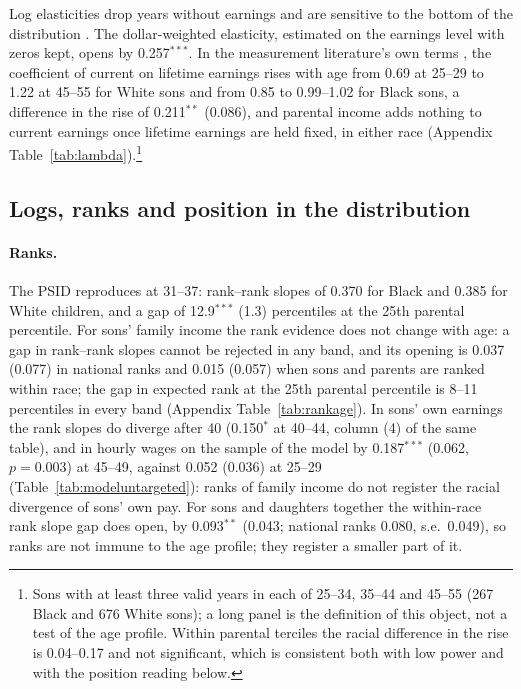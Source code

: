 Log elasticities drop years without earnings and are sensitive to the bottom of the distribution
\citep{mitnik2015new, mitnik2020intergenerational}. The dollar-weighted elasticity, estimated on the earnings level with
zeros kept, opens by 0.257$^{***}$. In the measurement literature's own terms \citep{haider2006life,
nybom2016heterogeneous}, the coefficient of current on lifetime earnings rises with age from 0.69 at 25--29 to 1.22 at
45--55 for White sons and from 0.85 to 0.99--1.02 for Black sons, a difference in the rise of 0.211$^{**}$ (0.086), and
parental income adds nothing to current earnings once lifetime earnings are held fixed, in either race (Appendix
Table~\ref{tab:lambda}).\footnote{Sons with at least three valid years in each of 25--34, 35--44 and 45--55 (267 Black
and 676 White sons); a long panel is the definition of this object, not a test of the age profile. Within parental
terciles the racial difference in the rise is 0.04--0.17 and not significant, which is consistent both with low power
and with the position reading below.}



\subsection{Logs, ranks and position in the distribution}

\paragraph{Ranks.} The PSID reproduces \citet{chetty2020race} at 31--37: rank--rank slopes of 0.370 for Black and
0.385 for White children, and a gap of 12.9$^{***}$ (1.3) percentiles at the 25th parental percentile. For sons' family income the rank
evidence does not change with age: a gap in rank--rank slopes cannot be rejected in any band, and its opening is 0.037
(0.077) in national ranks and 0.015 (0.057) when sons and parents are ranked within race; the gap in expected rank at
the 25th parental percentile is 8--11 percentiles in every band (Appendix Table~\ref{tab:rankage}). In sons' own
earnings the rank slopes do diverge after 40 (0.150$^{*}$ at 40--44, column (4) of the same table), and in hourly
wages on the sample of the model by 0.187$^{***}$ (0.062, $p = 0.003$) at 45--49, against 0.052 (0.036) at 25--29
(Table~\ref{tab:modeluntargeted}): ranks of family income do
not register the racial divergence of sons' own pay. For sons and
daughters together the within-race rank slope gap does open, by 0.093$^{**}$ (0.043; national ranks 0.080, s.e.\ 0.049),
so ranks are not immune to the age profile; they register a smaller part of it.

